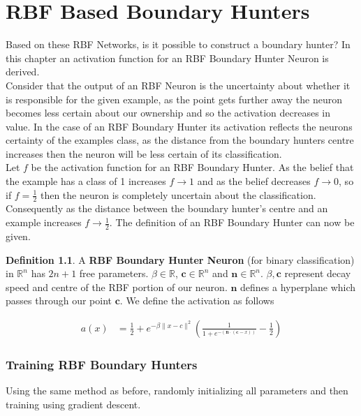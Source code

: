 \documentclass[notitlepage]{report}
\theoremstyle{definition}
\newtheorem{definition}{Definition}[section]
\begin{document}
\chapter{RBF Based Boundary Hunters}
Based on these RBF Networks, is it possible to construct a boundary hunter? In this chapter an activation function for an RBF Boundary Hunter Neuron is derived.\\

Consider that the output of an RBF Neuron is the uncertainty about whether it is responsible for the given example, as the point gets further away the neuron becomes less certain about our ownership and so the activation decreases in value. In the case of an RBF Boundary Hunter its activation reflects the neurons certainty of the examples class, as the distance from the boundary hunters centre increases then the neuron will be less certain of its classification.\\

Let $f$ be the activation function for an RBF Boundary Hunter. As the belief that the example has a class of 1 increases $f \rightarrow 1$ and as the belief decreases $f \rightarrow 0$, so if $f = \frac{1}{2}$ then the neuron is completely uncertain about the classification. Consequently as the distance between the boundary hunter's centre and an example increases $f \rightarrow \frac{1}{2}$. The definition of an RBF Boundary Hunter can now be given.\\

\theoremstyle{definition}
\begin{definition}
A \textbf{RBF Boundary Hunter Neuron} (for binary classification) in $\mathbb{R}^n$ has $2n + 1$ free parameters. $\beta \in \mathbb{R}$, $\mathbf{c} \in \mathbb{R}^n$ and $\mathbf{n} \in \mathbb{R}^n$. $\beta, \mathbf{c}$ represent decay speed and centre of the RBF portion of our neuron. $\mathbf{n}$ defines a hyperplane which passes through our point $\mathbf{c}$. We define the activation as follows

\begin{align}
a(x) &= \frac{1}{2} + e^{-\beta \lVert x - c \lVert^2}(\frac{1}{1 + e^{-(\mathbf{n} \cdot (\mathbf{c} - x))}} - \frac{1}{2})
\label{equ:rbf-bh-activation}
\end{align}

\end{definition}

\subsection{Training RBF Boundary Hunters}
Using the same method as before, randomly initializing all parameters and then training using gradient descent.
\end{document}
